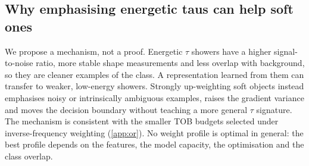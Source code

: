 \subsection{Why emphasising energetic taus can help soft ones}
We propose a mechanism, not a proof. Energetic $\tau$ showers have a higher signal-to-noise ratio, more stable shape measurements and less overlap with background, so they are cleaner examples of the class. A representation learned from them can transfer to weaker, low-energy showers. Strongly up-weighting soft objects instead emphasises noisy or intrinsically ambiguous examples, raises the gradient variance and moves the decision boundary without teaching a more general $\tau$ signature. The mechanism is consistent with the smaller TOB budgets selected under inverse-frequency weighting (\cref{app:or}). No weight profile is optimal in general: the best profile depends on the features, the model capacity, the optimisation and the class overlap.
